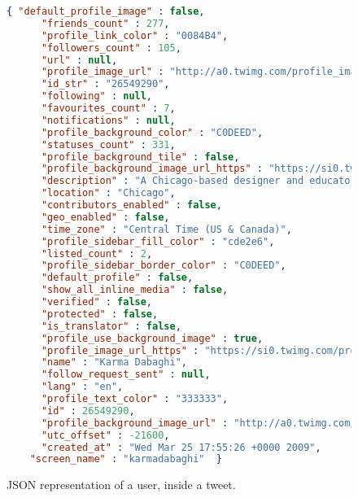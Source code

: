 \begin{figure}
  \begin{center}
    \begin{lstlisting}[language=json,firstnumber=1]
    { "default_profile_image" : false,
      "friends_count" : 277,
      "profile_link_color" : "0084B4",
      "followers_count" : 105,
      "url" : null,
      "profile_image_url" : "http://a0.twimg.com/profile_images/690647919/19335_266330051104_635886104_3750428_5949465_n_normal.jpg",
      "id_str" : "26549290",
      "following" : null,
      "favourites_count" : 7,
      "notifications" : null,
      "profile_background_color" : "C0DEED",
      "statuses_count" : 331,
      "profile_background_tile" : false,
      "profile_background_image_url_https" : "https://si0.twimg.com/profile_background_images/79871480/DSC09031_2.jpg",
      "description" : "A Chicago-based designer and educator fascinated with the power of design to ignite change \r\n\r\n",
      "location" : "Chicago",
      "contributors_enabled" : false,
      "geo_enabled" : false,
      "time_zone" : "Central Time (US & Canada)",
      "profile_sidebar_fill_color" : "cde2e6",
      "listed_count" : 2,
      "profile_sidebar_border_color" : "C0DEED",
      "default_profile" : false,
      "show_all_inline_media" : false,
      "verified" : false,
      "protected" : false,
      "is_translator" : false,
      "profile_use_background_image" : true,
      "profile_image_url_https" : "https://si0.twimg.com/profile_images/690647919/19335_266330051104_635886104_3750428_5949465_n_normal.jpg",
      "name" : "Karma Dabaghi",
      "follow_request_sent" : null,
      "lang" : "en",
      "profile_text_color" : "333333",
      "id" : 26549290,
      "profile_background_image_url" : "http://a0.twimg.com/profile_background_images/79871480/DSC09031_2.jpg",
      "utc_offset" : -21600,
      "created_at" : "Wed Mar 25 17:55:26 +0000 2009",
    "screen_name" : "karmadabaghi"  }
    \end{lstlisting}
  \end{center}
  \caption{\ac{JSON} representation of a user, inside a tweet.}
  \label{fig:json_tweet_user}
\end{figure}
